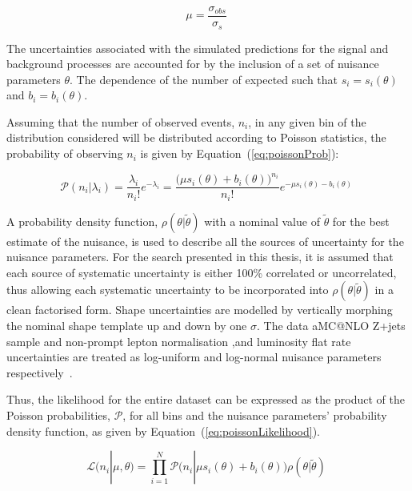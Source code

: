 \begin{equation}
\mu = \frac{\sigma_{obs}}{\sigma_{s}}  \;
\label{eq:signalModifier}
\end{equation}
 
The uncertainties associated with the simulated predictions for the signal and background processes are accounted for by the inclusion of a set of nuisance parameters $\theta$.
The dependence of the number of expected  such that $s_{i} = s_{i} (\theta)$ and $b_{i} = b_{i} (\theta)$.

Assuming that the number of observed events, $n_{i}$, in any given bin of the distribution considered will be distributed according to Poisson statistics, the probability of observing $n_{i}$ is given by Equation~(\ref{eq:poissonProb}):

\begin{equation}
\mathcal{P} ( n_{i} | \lambda_{i} ) = \frac{\lambda_{i}}{n_{i}!} e^{- \lambda_{i}} = \frac{ \big( \mu s_{i}(\theta) + b_{i}(\theta) \big)^{n_{i}}}{n_{i} !} e^{- \mu s_{i}(\theta) - b_{i}(\theta)}  \;
\label{eq:poissonProb}
\end{equation}

A probability density function, $\rho ( \theta | \tilde{\theta} )$ with a nominal value of $\tilde{\theta}$ for the best estimate of the nuisance, is used to describe all the sources of uncertainty for the nuisance parameters.
For the search presented in this thesis, it is assumed that each source of systematic uncertainty is either 100\% correlated or uncorrelated, thus allowing each systematic uncertainty to be incorporated into $\rho ( \theta | \tilde{\theta} )$ in a clean factorised form.
Shape uncertainties are modelled by vertically morphing the nominal shape template up and down by one $\sigma$.
The data aMC@NLO Z+jets sample and non-prompt lepton normalisation ,and luminosity flat rate uncertainties are treated as log-uniform and log-normal nuisance parameters respectively~\cite{Baak:2014fta,AsymptoticFormulae}.

Thus, the likelihood for the entire dataset can be expressed as the product of the Poisson probabilities, $\mathcal{P}$, for all bins and the nuisance parameters' probability density function, as given by Equation~(\ref{eq:poissonLikelihood}).

\begin{equation}
\mathcal{L} ( n_{i} | \mu , \theta ) = 
\prod_{i=1}^{N} \mathcal{P} \big( n_{i} | \mu s_{i}(\theta) + b_{i}(\theta) \big) \rho ( \theta | \tilde{\theta} ) \;
\label{eq:poissonLikelihood}
\end{equation}

